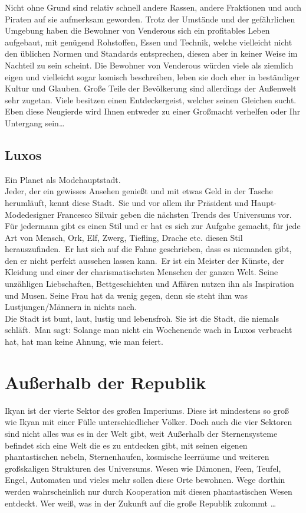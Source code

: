 \documentclass{book}
\begin{document}
Nicht ohne Grund sind relativ schnell andere Rassen, andere Fraktionen und auch Piraten auf sie aufmerksam geworden. Trotz der Umstände und der gefährlichen Umgebung haben die Bewohner von Venderous sich ein profitables Leben aufgebaut, mit genügend Rohstoffen, Essen und Technik, welche vielleicht nicht den üblichen Normen und Standards entsprechen, diesen aber in keiner Weise im Nachteil zu sein scheint. Die Bewohner von Venderous würden viele als ziemlich eigen und vielleicht sogar komisch beschreiben, leben sie doch eher in beständiger Kultur und Glauben. Große Teile der Bevölkerung sind allerdings der Außenwelt sehr zugetan. Viele besitzen einen Entdeckergeist, welcher seinen Gleichen sucht. Eben diese Neugierde wird Ihnen entweder zu einer Großmacht verhelfen oder Ihr Untergang sein\dots\\

\section{Luxos}
Ein Planet als Modehauptstadt.\\
Jeder, der ein gewisses Ansehen genießt und mit etwas Geld in der Tasche herumläuft, kennt diese Stadt. Sie und vor allem ihr Präsident und Haupt-Modedesigner Francesco Silvair geben die nächsten Trends des Universums vor. Für jedermann gibt es einen Stil und er hat es sich zur Aufgabe gemacht, für jede Art von Mensch, Ork, Elf, Zwerg, Tiefling, Drache etc. diesen Stil herauszufinden. Er hat sich auf die Fahne geschrieben, dass es niemanden gibt, den er nicht perfekt aussehen lassen kann. Er ist ein Meister der Künste, der Kleidung und einer der charismatischsten Menschen der ganzen Welt. Seine unzähligen Liebschaften, Bettgeschichten und Affären nutzen ihn als Inspiration und Musen. Seine Frau hat da wenig gegen, denn sie steht ihm was Lustjungen/Männern in nichts nach.\\
Die Stadt ist bunt, laut, lustig und lebensfroh. Sie ist die Stadt, die niemals schläft. Man sagt: Solange man nicht ein Wochenende wach in Luxos verbracht hat, hat man keine Ahnung, wie man feiert.

\chapter{Außerhalb der Republik}
    Ikyan ist der vierte Sektor des großen Imperiums. Diese ist mindestens so groß wie Ikyan mit einer Fülle unterschiedlicher Völker. Doch auch die vier Sektoren sind nicht alles was es in der Welt gibt, weit Außerhalb der Sternensysteme befindet sich eine Welt die es zu entdecken gibt, mit seinen eigenen phantastischen nebeln, Sternenhaufen, kosmische leerräume und weiteren großskaligen Strukturen des Universums. Wesen wie Dämonen, Feen, Teufel, Engel, Automaten und vieles mehr sollen diese Orte bewohnen. Wege dorthin werden wahrscheinlich nur durch Kooperation mit diesen phantastischen Wesen entdeckt. Wer weiß, was in der Zukunft auf die große Republik zukommt \dots
\end{document}
